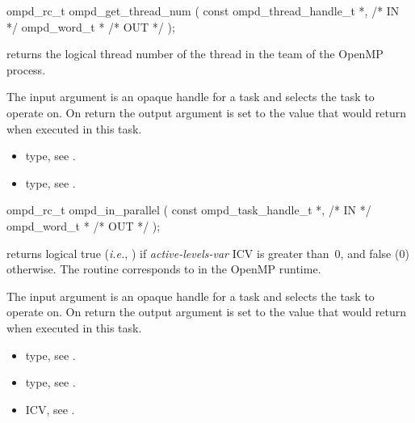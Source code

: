 \summary

\format
\cspecificstart
\begin{boxedcode}
ompd\_rc\_t ompd\_get\_thread\_num (
  const ompd\_thread\_handle\_t *,                       /* IN */
  ompd\_word\_t *                                 /* OUT */
);
\end{boxedcode}
\cspecificend

\descr
{} returns the logical thread number of the thread in the team of the OpenMP process.


\argdesc
The input argument  is an opaque handle for a task and selects the task to operate on.
On return the output argument  is set to the value that  would return when
executed in this task.

\crossreferences
\begin{itemize}
	\item {} type, see .
	\item {} type, see .
\end{itemize}


\summary

\format
\cspecificstart
\begin{boxedcode}
ompd\_rc\_t ompd\_in\_parallel (
  const ompd\_task\_handle\_t  *,                           /* IN */
  ompd\_word\_t              *                                   /* OUT */
); 
\end{boxedcode}
\cspecificend

\descr
{} returns logical true (\textit{i.e.}, )
if \emph{active-levels-var}
ICV is greater than~0, and false (0) otherwise.
The routine corresponds to  in the OpenMP runtime.

\argdesc
The input argument  is an opaque handle for a task and selects the task to operate on.
On return the output argument  is set to the value that  would return when
executed in this task.

\crossreferences
\begin{itemize}
	\item {} type, see .
	\item {} type, see .
	\item {} ICV, see .
\end{itemize}


